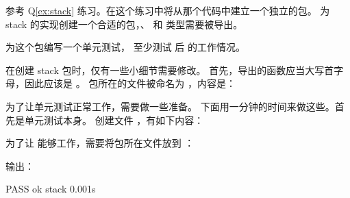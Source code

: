 \begin{Exercise}[title={stack 包},difficulty=0]
\label{ex:stack-package}
\Question\label{ex:stack-package q1} 
参考 Q\ref{ex:stack} 练习。在这个练习中将从那个代码中建立一个独立的包。
为 stack 的实现创建一个合适的包，、 和  类型需要被导出。

\Question\label{ex:stack-package q2} 为这个包编写一个单元测试，
至少测试  后  的工作情况。

\end{Exercise}

\begin{Answer}
\Question 在创建 stack 包时，仅有一些小细节需要修改。
首先，导出的函数应当大写首字母，因此应该是 。
包所在的文件被命名为 ，内容是：


\Question 为了让单元测试正常工作，需要做一些准备。
下面用一分钟的时间来做这些。首先是单元测试本身。
创建文件 ，有如下内容：

为了让  能够工作，需要将包所在文件放到 
：\\

\begin{display}
\pr {}
\pr {}
\pr {}
\end{display}

输出：\\

\begin{display}
\pr {}
PASS
ok      stack   0.001s
\end{display}
\end{Answer}
